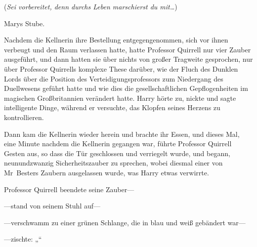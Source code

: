 (\emph{Sei vorbereitet, denn durchs Leben marschierst du mit…})

Marys Stube.

Nachdem die Kellnerin ihre Bestellung entgegengenommen, sich vor ihnen verbeugt und den Raum verlassen hatte, hatte Professor Quirrell nur vier Zauber ausgeführt, und dann hatten sie über nichts von großer Tragweite gesprochen, nur über Professor Quirrells komplexe These darüber, wie der Fluch des Dunklen Lords über die Position des Verteidigungsprofessors zum Niedergang des Duellwesens geführt hatte und wie dies die gesellschaftlichen Gepflogenheiten im magischen Großbritannien verändert hatte. Harry hörte zu, nickte und sagte intelligente Dinge, während er versuchte, das Klopfen seines Herzens zu kontrollieren.

Dann kam die Kellnerin wieder herein und brachte ihr Essen, und dieses Mal, eine Minute nachdem die Kellnerin gegangen war, führte Professor Quirrell Gesten aus, so dass die Tür geschlossen und verriegelt wurde, und begann, neunundzwanzig Sicherheitszauber zu sprechen, wobei diesmal einer von Mr~Besters Zaubern ausgelassen wurde, was Harry etwas verwirrte.

Professor Quirrell beendete seine Zauber—

—stand von seinem Stuhl auf—

—verschwamm zu einer grünen Schlange, die in blau und weiß gebändert war—

—zischte: „“

